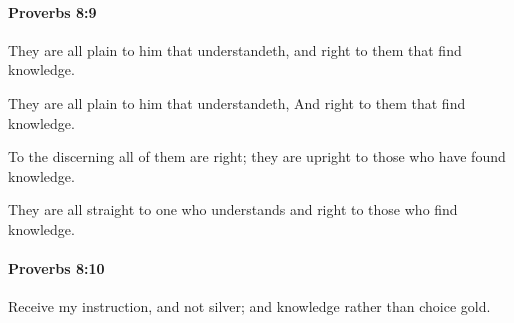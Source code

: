 		\paragraph{Proverbs 8:9} %
			\label{PROVERBS-8-9}

			They are all plain to him that understandeth, and right to them that find knowledge.

			\begin{versebox}
					\item[BHS] 
					\item[ASV] They are all plain to him that understandeth, And right to them that find knowledge.
					\item[NIV] To the discerning all of them are right; they are upright to those who have found knowledge.
					\item[NRSV] They are all straight to one who understands and right to those who find knowledge.
			\end{versebox}

		\paragraph{Proverbs 8:10} %
			\label{PROVERBS-8-10}

			Receive my instruction, and not silver; and knowledge rather than choice gold.

